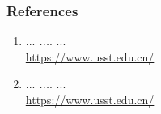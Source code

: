 \documentclass[10pt, aspectratio=169]{beamer}
\begin{document}
\begin{frame}[t]
    \frametitle{References}
    \vspace*{-0.2cm}
    \footnotesize %
    \begin{enumerate}
        \item ...
        \textit{...}. ...
        \\
        {\scriptsize \url{https://www.usst.edu.cn/}} %
        \vspace{0.15cm} %
        
        \item ...
        \textit{...}. ...
        \\
        {\scriptsize \url{https://www.usst.edu.cn/}}
        \vspace{0.15cm}
    \end{enumerate}
\end{frame}
\end{document}
